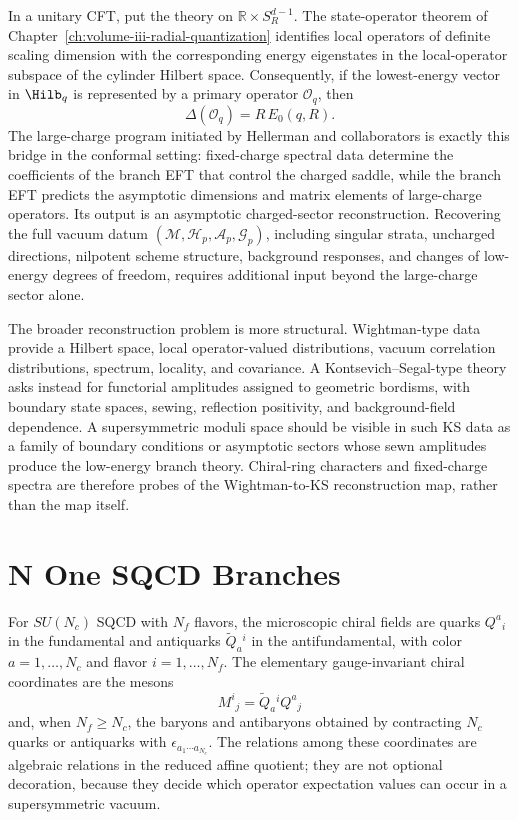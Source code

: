 In a unitary CFT, put the theory on
\(\mathbb R\times S^{d-1}_R\).  The state-operator theorem of
Chapter~\ref{ch:volume-iii-radial-quantization} identifies local
operators of definite scaling dimension with the corresponding energy
eigenstates in the local-operator subspace of the cylinder Hilbert space.
Consequently, if the lowest-energy vector in \(\Hilb_q\) is represented by
a primary operator \(\mathcal O_q\), then
\[
  \Delta(\mathcal O_q)=R\,E_0(q,R).
\]
The large-charge program initiated by Hellerman and collaborators is exactly
this bridge in the conformal setting: fixed-charge spectral data determine
the coefficients of the branch EFT that control the charged saddle, while
the branch EFT predicts the asymptotic dimensions and matrix elements of
large-charge operators.  Its output is an asymptotic charged-sector
reconstruction.  Recovering the full vacuum datum
\((\mathcal M,\mathcal H_p,\mathcal A_p,\mathcal G_p)\), including
singular strata, uncharged directions, nilpotent scheme structure,
background responses, and changes of low-energy degrees of freedom, requires
additional input beyond the large-charge sector alone.

The broader reconstruction problem is more structural.  Wightman-type data
provide a Hilbert space, local operator-valued distributions, vacuum
correlation distributions, spectrum, locality, and covariance.  A
Kontsevich--Segal-type theory asks instead for functorial amplitudes assigned
to geometric bordisms, with boundary state spaces, sewing, reflection
positivity, and background-field dependence.  A supersymmetric moduli space
should be visible in such KS data as a family of boundary conditions or
asymptotic sectors whose sewn amplitudes produce the low-energy branch
theory.  Chiral-ring characters and fixed-charge spectra are therefore
probes of the Wightman-to-KS reconstruction map, rather than the map itself.

\section{N One SQCD Branches}

For \(SU(N_c)\) SQCD with \(N_f\) flavors, the microscopic chiral fields are
quarks \(Q^a{}_i\) in the fundamental and antiquarks
\(\widetilde Q_a{}^i\) in the antifundamental, with color
\(a=1,\ldots,N_c\) and flavor \(i=1,\ldots,N_f\).  The elementary
gauge-invariant chiral coordinates are the mesons
\[
  M^i{}_j=\widetilde Q_a{}^i Q^a{}_j
\]
and, when \(N_f\geq N_c\), the baryons and antibaryons obtained by
contracting \(N_c\) quarks or antiquarks with \(\epsilon_{a_1\cdots a_{N_c}}\).
The relations among these coordinates are algebraic relations in the reduced
affine quotient; they are not optional decoration, because they decide which
operator expectation values can occur in a supersymmetric vacuum.


